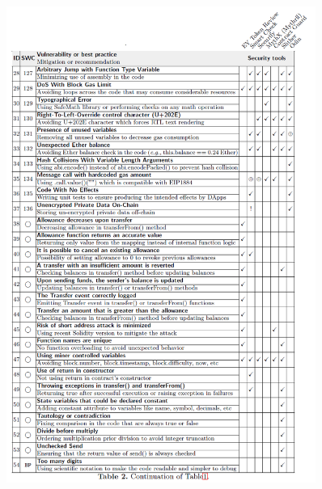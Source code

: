 \begin{figure}[t!]
	\centering
	\includegraphics[width=0.9\textwidth]{figures/table2.png}
\end{figure}

